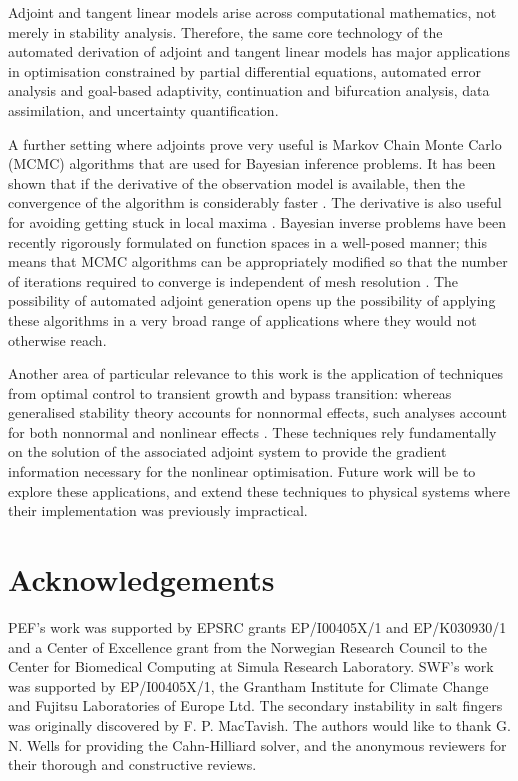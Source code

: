 \documentclass{siamltex}
\begin{document}
Adjoint and tangent linear models arise across computational mathematics, not merely in stability
analysis. Therefore, the same core technology of the automated derivation of adjoint and tangent
linear models has major applications in optimisation constrained by partial differential equations,
automated error analysis and goal-based adaptivity, continuation and bifurcation analysis, data
assimilation, and uncertainty quantification.

A further setting where adjoints prove very useful is Markov Chain Monte Carlo (MCMC) algorithms that
are used for Bayesian inference problems.  It has been shown that if the derivative of the
observation model is available, then the convergence of the algorithm is considerably faster
\cite{roberts1996,martin2012}. The derivative is also useful for avoiding getting stuck in local maxima
\cite{beskos2011}. Bayesian inverse problems have been recently rigorously formulated on function
spaces in a well-posed manner; this means that MCMC algorithms can be appropriately modified so that
the number of iterations required to converge is independent of mesh resolution \cite{cotter2010}.
The possibility of automated adjoint generation opens up the possibility of applying these
algorithms in a very broad range of applications where they would not otherwise reach.

Another area of particular relevance to this work is the application of techniques from optimal
control to transient growth and bypass transition: whereas generalised stability theory accounts
for nonnormal effects, such analyses account for both nonnormal and nonlinear effects
\cite{monokrousos2011,juniper2011b,juniper2011a}.  These techniques rely fundamentally on the
solution of the associated adjoint system to provide the gradient information necessary for the
nonlinear optimisation.  Future work will be to explore these applications, and extend these
techniques to physical systems where their implementation was previously impractical.

\section*{Acknowledgements}
PEF's work was supported by EPSRC grants EP/I00405X/1 and EP/K030930/1 and a Center of Excellence grant from the
Norwegian Research Council to the Center for Biomedical Computing at Simula Research Laboratory.
SWF's work was supported by EP/I00405X/1, the Grantham Institute for Climate Change and Fujitsu Laboratories of Europe Ltd.
The secondary instability in salt fingers was originally discovered by F. P. MacTavish.  The authors
would like to thank G. N. Wells for providing the Cahn-Hilliard solver, and the anonymous reviewers for
their thorough and constructive reviews. 



\end{document}
